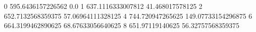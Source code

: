0 595.6436157226562 0.0
1 637.1116333007812 41.468017578125
2 652.7132568359375 57.06964111328125
4 744.720947265625 149.07733154296875
6 664.3199462890625 68.67633056640625
8 651.97119140625 56.32757568359375
